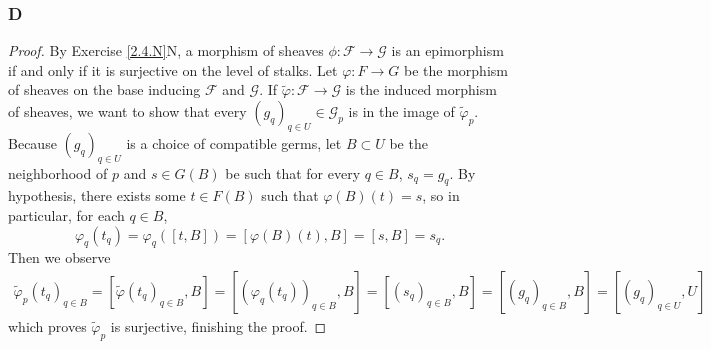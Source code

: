 \documentclass{article}
\newcommand{\fF}{\mathscr{F}}
\newcommand{\fG}{\mathscr{G}}
\begin{document}
\subsubsection{D}\label{2.5.D}
\begin{proof}
    By Exercise \ref{2.4.N}N, a morphism of sheaves $\phi:\fF\to \fG$ is an epimorphism if and only if it is surjective on the level of stalks. Let $\varphi:F\to G$ be the morphism of sheaves on the base inducing $\fF$ and $\fG$. If $\tilde \varphi:\fF\to \fG$ is the induced morphism of sheaves, we want to show that every $(g_q)_{q\in U}\in \fG_p$ is in the image of $\tilde \varphi_p$. Because $(g_q)_{q\in U}$ is a choice of compatible germs, let $B\subset U$ be the neighborhood of $p$ and $s\in G(B)$ be such that for every $q\in B$, $s_q=g_q$. By hypothesis, there exists some $t\in F(B)$ such that $\varphi(B)(t)=s$, so in particular, for each $q\in B$, 
    \[
    \varphi_q(t_q)=\varphi_q([t,B])=[\varphi(B)(t),B]=[s,B]=s_q.
    \]
    Then we observe
    \begin{align*}
        \tilde \varphi_p(t_q)_{q\in B}=[\tilde \varphi(t_q)_{q\in B},B]=[(\varphi_q(t_q))_{q\in B},B]=[(s_q)_{q\in B},B]=[(g_q)_{q\in B},B]=[(g_q)_{q\in U},U]
    \end{align*}
    which proves $\tilde \varphi_p$ is surjective, finishing the proof.
\end{proof}
\end{document}
